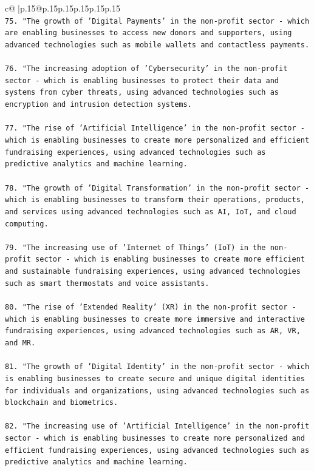 \documentclass{article}
\begin{document}
{\begin{supertabular}{c@{$\;$}|p{.15\linewidth}@{}p{.15\linewidth}p{.15\linewidth}p{.15\linewidth}p{.15\linewidth}p{.15\linewidth}}
{{{\\ 
\texttt{75. "The growth of 'Digital Payments' in the non{-}profit sector {-} which are enabling businesses to access new donors and supporters, using advanced technologies such as mobile wallets and contactless payments.} \\
\\ 
\texttt{76. "The increasing adoption of 'Cybersecurity' in the non{-}profit sector {-} which is enabling businesses to protect their data and systems from cyber threats, using advanced technologies such as encryption and intrusion detection systems.} \\
\\ 
\texttt{77. "The rise of 'Artificial Intelligence' in the non{-}profit sector {-} which is enabling businesses to create more personalized and efficient fundraising experiences, using advanced technologies such as predictive analytics and machine learning.} \\
\\ 
\texttt{78. "The growth of 'Digital Transformation' in the non{-}profit sector {-} which is enabling businesses to transform their operations, products, and services using advanced technologies such as AI, IoT, and cloud computing.} \\
\\ 
\texttt{79. "The increasing use of 'Internet of Things' (IoT) in the non{-}profit sector {-} which is enabling businesses to create more efficient and sustainable fundraising experiences, using advanced technologies such as smart thermostats and voice assistants.} \\
\\ 
\texttt{80. "The rise of 'Extended Reality' (XR) in the non{-}profit sector {-} which is enabling businesses to create more immersive and interactive fundraising experiences, using advanced technologies such as AR, VR, and MR.} \\
\\ 
\texttt{81. "The growth of 'Digital Identity' in the non{-}profit sector {-} which is enabling businesses to create secure and unique digital identities for individuals and organizations, using advanced technologies such as blockchain and biometrics.} \\
\\ 
\texttt{82. "The increasing use of 'Artificial Intelligence' in the non{-}profit sector {-} which is enabling businesses to create more personalized and efficient fundraising experiences, using advanced technologies such as predictive analytics and machine learning.} \\
}}}
\end{supertabular}}
\end{document}
